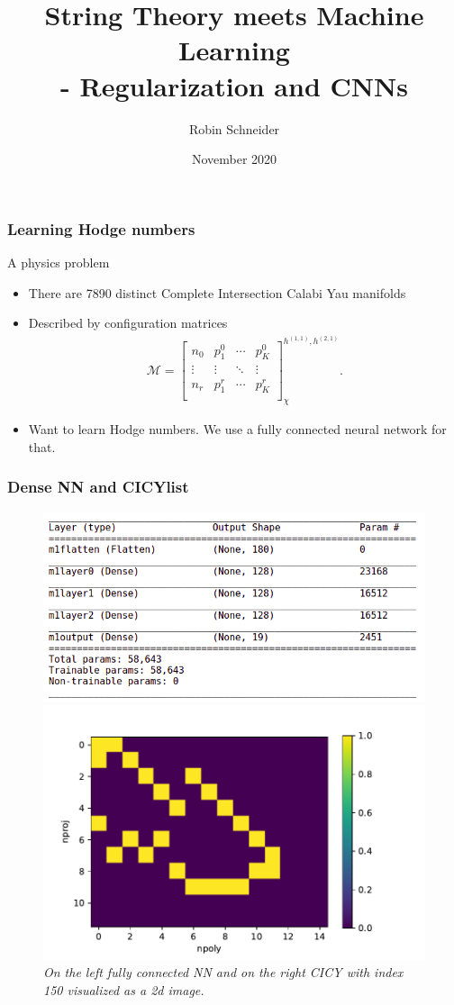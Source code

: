 \documentclass{beamer}
\title[Regularization and CNNs]{String Theory meets Machine Learning\\
	- Regularization and CNNs}
\author{Robin Schneider}
\institute{Uppsala University}
\date{November 2020}
\newcommand{\bi}{\begin{itemize}}
\newcommand{\ei}{\end{itemize}}
\begin{document}
	
	\frame{\titlepage}



\begin{frame}
\frametitle{Learning Hodge numbers}
A physics problem
\bi
\item There are 7890 distinct Complete Intersection Calabi Yau manifolds
\item Described by configuration matrices
\begin{align}
\mathcal{M} =  \left[
\begin{array}{c||ccc}
n_0 & p^0_1 & \cdots & p^0_{K} \\
\vdots & \vdots & \ddots & \vdots \\
n_r & p^{r}_1 & \cdots & p^{r}_K  \\
\end{array}
\right]^{h^{(1,1)},h^{(2,1)}}_{\chi}.
\end{align}
\item Want to learn Hodge numbers. We use a fully connected neural network for that.
\ei
\end{frame}

\begin{frame}
\frametitle{Dense NN and CICYlist}
\begin{figure}[t]
	\begin{minipage}{0.5\linewidth}
		\includegraphics[scale=0.28]{dense.png}
	\end{minipage}
	\begin{minipage}{0.45\linewidth}
		\includegraphics[scale=0.4]{cicy150.pdf}
	\end{minipage}
	\caption{\it On the left fully connected NN and on the right CICY with index 150 visualized as a 2d image.}
	\label{fig:cicy}
\end{figure}
\end{frame}
	
\end{document}
